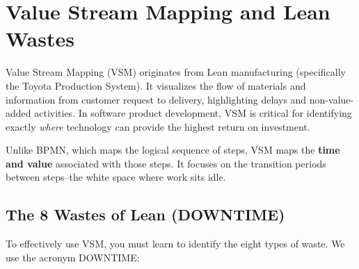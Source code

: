 \documentclass[
  11pt,
  openany,
  oneside]{book}
\begin{document}
\bigskip

\section{Value Stream Mapping and Lean
Wastes}\label{value-stream-mapping-and-lean-wastes}

Value Stream Mapping (VSM) originates from Lean manufacturing
(specifically the Toyota Production System). It visualizes the flow of
materials and information from customer request to delivery,
highlighting delays and non-value-added activities. In software product
development, VSM is critical for identifying exactly \emph{where}
technology can provide the highest return on investment.

Unlike BPMN, which maps the logical sequence of steps, VSM maps the
\textbf{time and value} associated with those steps. It focuses on the
transition periods between steps--the white space where work sits idle.

\subsection{The 8 Wastes of Lean
(DOWNTIME)}\label{the-8-wastes-of-lean-downtime}

To effectively use VSM, you must learn to identify the eight types of
waste. We use the acronym DOWNTIME:
\end{document}
